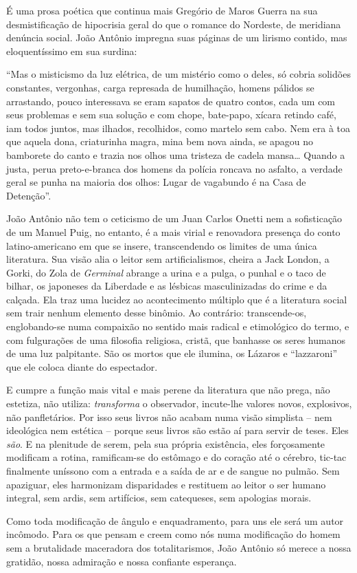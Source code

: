 \documentclass[
  letterpaper,
  DIV=11,
  numbers=noendperiod]{scrartcl}
\begin{document}
É uma prosa poética que continua mais Gregório de Maros Guerra na sua
desmistificação de hipocrisia geral do que o romance do Nordeste, de
meridiana denúncia social. João Antônio impregna suas páginas de um
lirismo contido, mas eloquentíssimo em sua surdina:

``Mas o misticismo da luz elétrica, de um mistério como o deles, só
cobria solidões constantes, vergonhas, carga represada de humilhação,
homens pálidos se arrastando, pouco interessava se eram sapatos de
quatro contos, cada um com seus problemas e sem sua solução e com chope,
bate-papo, xícara retindo café, iam todos juntos, mas ilhados,
recolhidos, como martelo sem cabo. Nem era à toa que aquela dona,
criaturinha magra, mina bem nova ainda, se apagou no bamborete do canto
e trazia nos olhos uma tristeza de cadela mansa\ldots{} Quando a justa,
perua preto-e-branca dos homens da polícia roncava no asfalto, a verdade
geral se punha na maioria dos olhos: Lugar de vagabundo é na Casa de
Detenção''.

João Antônio não tem o ceticismo de um Juan Carlos Onetti nem a
sofisticação de um Manuel Puig, no entanto, é a mais virial e renovadora
presença do conto latino-americano em que se insere, transcendendo os
limites de uma única literatura. Sua visão alia o leitor sem
artificialismos, cheira a Jack London, a Gorki, do Zola de
\emph{Germinal} abrange a urina e a pulga, o punhal e o taco de bilhar,
os japoneses da Liberdade e as lésbicas masculinizadas do crime e da
calçada. Ela traz uma lucidez ao acontecimento múltiplo que é a
literatura social sem trair nenhum elemento desse binômio. Ao contrário:
transcende-os, englobando-se numa compaixão no sentido mais radical e
etimológico do termo, e com fulgurações de uma filosofia religiosa,
cristã, que banhasse os seres humanos de uma luz palpitante. São os
mortos que ele ilumina, os Lázaros e ``lazzaroni'' que ele coloca diante
do espectador.

E cumpre a função mais vital e mais perene da literatura que não prega,
não estetiza, não utiliza: \emph{transforma} o observador, incute-lhe
valores novos, explosivos, não panfletários. Por isso seus livros não
acabam numa visão simplista -- nem ideológica nem estética -- porque
seus livros são estão aí para servir de teses. Eles \emph{são}. E na
plenitude de serem, pela sua própria existência, eles forçosamente
modificam a rotina, ramificam-se do estômago e do coração até o cérebro,
tic-tac finalmente uníssono com a entrada e a saída de ar e de sangue no
pulmão. Sem apaziguar, eles harmonizam disparidades e restituem ao
leitor o ser humano integral, sem ardis, sem artifícios, sem catequeses,
sem apologias morais.

Como toda modificação de ângulo e enquadramento, para uns ele será um
autor incômodo. Para os que pensam e creem como nós numa modificação do
homem sem a brutalidade maceradora dos totalitarismos, João Antônio só
merece a nossa gratidão, nossa admiração e nossa confiante esperança.
\end{document}
